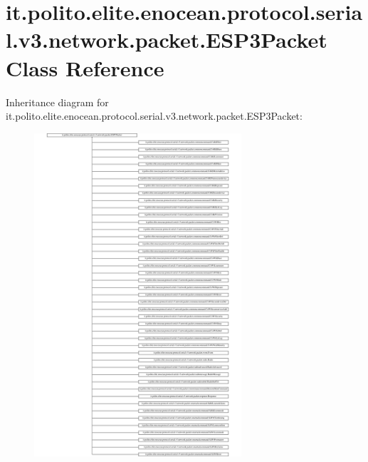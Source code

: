 \hypertarget{classit_1_1polito_1_1elite_1_1enocean_1_1protocol_1_1serial_1_1v3_1_1network_1_1packet_1_1_e_s_p3_packet}{}\section{it.\+polito.\+elite.\+enocean.\+protocol.\+serial.\+v3.\+network.\+packet.\+E\+S\+P3\+Packet Class Reference}
\label{classit_1_1polito_1_1elite_1_1enocean_1_1protocol_1_1serial_1_1v3_1_1network_1_1packet_1_1_e_s_p3_packet}
Inheritance diagram for it.\+polito.\+elite.\+enocean.\+protocol.\+serial.\+v3.\+network.\+packet.\+E\+S\+P3\+Packet\+:\begin{figure}[H]
\begin{center}
\leavevmode
\includegraphics[height=12.000000cm]{classit_1_1polito_1_1elite_1_1enocean_1_1protocol_1_1serial_1_1v3_1_1network_1_1packet_1_1_e_s_p3_packet}
\end{center}
\end{figure}
